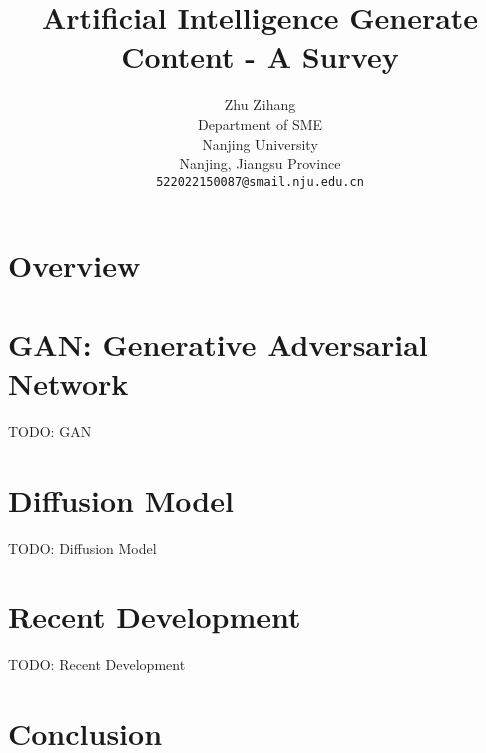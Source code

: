 \documentclass{arxiv_art/arxiv_art}
\title{Artificial Intelligence Generate Content - A Survey}
\author{
    \hspace{1mm}Zhu Zihang \\
    Department of SME \\
    Nanjing University\\
    Nanjing, Jiangsu Province \\
    \texttt{522022150087@smail.nju.edu.cn}
}
\begin{document}
\maketitle

\begin{abstract}
    
\end{abstract}

\section{Overview}\label{sec:overview}


\section{GAN: Generative Adversarial Network}\label{sec:gan}
TODO: GAN

\section{Diffusion Model}\label{sec:diffusion}
TODO: Diffusion Model

\section{Recent Development}\label{sec:recent}
TODO: Recent Development

\section{Conclusion}\label{sec:conclusion}




\end{document}
